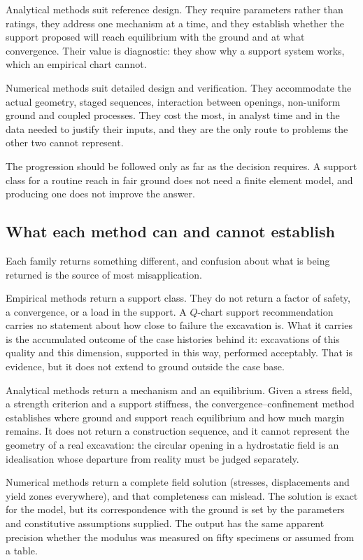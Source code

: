 Analytical methods suit reference design. They require parameters rather than
ratings, they address one mechanism at a time, and they establish whether the
support proposed will reach equilibrium with the ground and at what
convergence. Their value is diagnostic: they show why a support system works,
which an empirical chart cannot.

Numerical methods suit detailed design and verification. They accommodate the actual
geometry, staged sequences, interaction between openings, non-uniform ground
and coupled processes. They cost the most, in analyst time and in the data
needed to justify their inputs, and they are the only route to problems the
other two cannot represent.

The progression
should be followed only as far as the decision requires. A support class for
a routine reach in fair ground does not need a finite element model, and
producing one does not improve the answer.

\subsection{What each method can and cannot establish}
\label{sec:method-limits}

Each family returns something different, and confusion about what is being
returned is the source of most misapplication.

Empirical methods return a support class. They do not return a factor of
safety, a convergence, or a load in the support. A $Q$-chart support
recommendation carries no statement about how close to failure the excavation
is. What it carries is the accumulated outcome of the case histories behind
it: excavations of this quality and this dimension, supported in this way,
performed acceptably. That is evidence, but it does not extend to ground
outside the case base.

Analytical methods return a mechanism and an equilibrium. Given a stress
field, a strength criterion and a support stiffness, the
convergence--confinement method establishes where ground and support reach
equilibrium and how much margin remains. It does not return a construction
sequence, and it cannot represent the geometry of a real excavation: the
circular opening in a hydrostatic field is an idealisation whose departure
from reality must be judged separately.

Numerical methods return a complete field solution (stresses,
displacements and yield zones everywhere), and that completeness can
mislead. The solution is exact for the model, but its correspondence
with the ground is set by the parameters and constitutive assumptions
supplied. The output has the same apparent precision whether the modulus
was measured on fifty specimens or assumed from a table.

